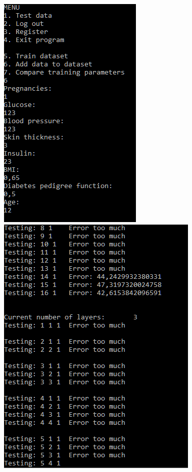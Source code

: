 \documentclass[12pt,a4paper]{article}
\begin{document}
\includegraphics[width=0.4\linewidth]{media/program5}
\includegraphics[width=0.4\linewidth]{media/program6}\\
\end{document}

